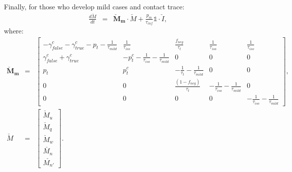 \documentclass[notitlepage, superscriptaddress]{revtex4-2}
\begin{document}
Finally, for those who develop mild cases and contact trace:
\begin{eqnarray}
\frac{d\check{M}}{dt} &=& \boldsymbol{\check{M}_{m}} \cdot \check{M} + \frac{p_{m}}{\tau_{inf}} \mathbb{1} \cdot  \check{I}, 
\end{eqnarray}
where:
%
\begin{eqnarray}
\boldsymbol{\check{M}_{m}} &=&
\begin{bmatrix}
 -\gamma^{c}_{false} -\gamma^{c}_{true} - p_{t} -\frac{1}{\tau_{mild}} & \frac{1}{\tau_{iso}}  & \frac{f_{neg}}{\tau_{t}} & \frac{1}{\tau_{iso}} & \frac{1}{\tau_{iso}} \\
\gamma^{c}_{false} + \gamma^{c}_{true}    &  -p^{c}_{t}  - \frac{1}{\tau_{iso}} - \frac{1}{\tau_{mild}}      &  0    & 0  & 0\\
p_{t}     &  p^{c}_{t}                  &  -\frac{1}{\tau_{t}}  - \frac{1}{\tau_{mild}}  & 0 & 0\\
0 & 0 & \frac{(1-f_{neg})}{\tau_{t}}  & -\frac{1}{\tau_{iso}}  -  \frac{1}{\tau_{mild}} & 0 \\ 
0 & 0 & 0 & 0 & -\frac{1}{\tau_{iso}}  -  \frac{1}{\tau_{mild}}
\end{bmatrix}, \\ 
%
\check{M} &=& 
\begin{bmatrix}
\check{M}_{u} \\ \check{M}_{q} \\ \check{M}_{w}\\ \check{M_{n}} \\ \check{M_{n'}}
\end{bmatrix}. \\ 
%
%
\end{eqnarray}



\end{document}
